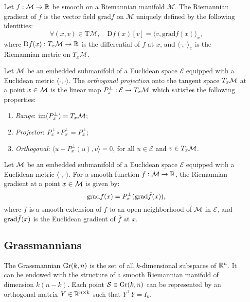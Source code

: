 \begin{definition}
    Let $f : \mathcal{M} \to \mathbb{R}$ be smooth on a Riemannian manifold $\mathcal{M}$. The Riemannian gradient of $f$ is the vector field $\textrm{grad}f$ on $\mathcal{M}$ uniquely defined by the following identities:
    \[
        \forall (x,v) \in \textrm{T}\mathcal{M}, \quad \textrm{D}f(x)[v] = \langle v, \textrm{grad}f(x) \rangle_x,
    \]
    where $\textrm{D}f(x) : T_x \mathcal{M} \to \mathbb{R}$ is the differential of $f$ at $x$, and $\langle \cdot, \cdot \rangle_x$ is the Riemannian metric on $T_x \mathcal{M}$.
\end{definition}

\begin{definition}[Projection]
    Let $\mathcal{M}$ be an embedded submanifold of a Euclidean space $\mathcal{E}$ equipped with a Euclidean metric $\langle \cdot, \cdot \rangle$. The \textit{orthogonal projection} onto the tangent space $T_x \mathcal{M}$ at a point $x \in \mathcal{M}$ is the linear map $P^{\perp}_x : \mathcal{E} \to T_x \mathcal{M}$ which satisfies the following properties:
    \begin{enumerate}
        \item \textit{Range}: $\textrm{im}(P^{\perp}_x) = T_x \mathcal{M}$;
        \item \textit{Projector}: $P^{\perp}_x \circ P^{\perp}_x = P^{\perp}_x$;
        \item \textit{Orthogonal}: $\langle u - P^{\perp}_x(u), v \rangle = 0$, for all $u \in \mathcal{E}$ and $v \in T_x \mathcal{M}$.
    \end{enumerate}
    
\end{definition}

\begin{proposition}\label{prop:riem_grad}
    Let $\mathcal{M}$ be an embedded submanifold of a Euclidean space $\mathcal{E}$ equipped with a Euclidean metric $\langle \cdot, \cdot \rangle$. For a smooth function $f : \mathcal{M} \to \mathbb{R}$, the Riemannian gradient at a point $x \in \mathcal{M}$ is given by:
    \[
        \textrm{grad}f(x) = P^{\perp}_x(\mathrm{grad }{\bar{f}}(x)),
    \]
    where $\bar{f}$ is a smooth extension of $f$ to an open neighborhood of $\mathcal{M}$ in $\mathcal{E}$, and $\mathrm{grad }{\bar{f}}(x)$ is the Euclidean gradient of $\bar{f}$ at $x$.
\end{proposition}

\subsection{Grassmannians}
The Grassmannian $\text{Gr}(k,n)$ is the set of all $k$-dimensional subspaces of $\mathbb{R}^n$. It can be endowed with the structure of a smooth Riemannian manifold of dimension $k(n-k)$. Each point $\mathcal{S} \in \text{Gr}(k,n)$ can be represented by an orthogonal matrix $Y \in \mathbb{R}^{n \times k}$ such that $Y^\top Y = I_k$.

